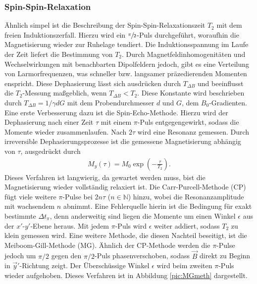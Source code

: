 \subsubsection{Spin-Spin-Relaxation}
Ähnlich simpel ist die Beschreibung der Spin-Spin-Relaxationszeit $T_2$ mit dem freien Induktionszerfall. Hierzu wird ein $\sfrac{\pi}{2}$-Puls
durchgeführt, woraufhin die Magnetisierung wieder zur Ruhelage tendiert. Die Induktionsspannung im Laufe der Zeit liefert die Bestimmung von $T_2$.
Durch Magnetfeldinhomogenitäten und Wechselwirkungen mit benachbarten Dipolfeldern jedoch, gibt es eine Verteilung von Larmorfrequenzen, was 
schneller bzw. langsamer präzedierenden Momenten enspricht. Diese Dephasierung lässt sich ausdrücken durch $T_{\Delta B}$ und beeinflusst
die $T_2$-Messung maßgeblich, wenn $T_{\Delta B} < T_2$. Diese Konstante wird beschrieben durch $T_{\Delta B} = 1/\gamma d G$ mit dem 
Probendurchmesser $d$ und $G$, dem $B_0$-Gradienten.\\
\noindent Eine erste Verbesserung dazu ist die Spin-Echo-Methode. Hierzu wird der Dephasierung nach einer Zeit $\tau $ mit einem $\pi$-Puls 
entgegengewirkt, sodass die Momente wieder zusammenlaufen. Nach $2\tau$ wird eine Resonanz gemessen. Durch irreversible Dephasierungsprozesse
ist die gemessene Magnetisierung abhängig von $\tau$, ausgedrückt durch
\begin{align}
 M_y(\tau) = M_0\exp\left(-\frac{\tau}{T_2} \right).
\end{align}
Dieses Verfahren ist langwierig, da gewartet werden muss, bist die Magnetisierung wieder vollständig relaxiert ist. Die Carr-Purcell-Methode (CP)
fügt viele weitere $\pi$-Pulse bei $2n\tau$ ($n\in\mathbb{N}$) hinzu, wobei die Resonanzamplitude mit wachsendem $n$ abnimmt. Eine Fehlerquelle
hierin ist die Bedingung für exakt bestimmte $\Delta t_{\pi}$, denn anderweitig sind liegen die Momente um einen Winkel $\epsilon$ aus der 
$x'$-$y'$-Ebene heraus. Mit jedem $\pi$-Puls wird $\epsilon$ weiter addiert, sodass $T_2$ zu klein gemessen wird. Eine weitere Methode, die 
diesen Nachteil beseitigt, ist die Meiboom-Gill-Methode (MG). Ähnlich der CP-Methode werden die $\pi$-Pulse jedoch um $\pi/2$ gegen den 
$\pi/2$-Puls phasenverschoben, sodass $\vec B$ direkt zu Beginn in $\vec y'$-Richtung zeigt. Der Überschüssige Winkel $\epsilon$ wird beim
zweiten $\pi$-Puls wieder aufgehoben. Dieses Verfahren ist in Abbildung \ref{pic:MGmeth} dargestellt.

